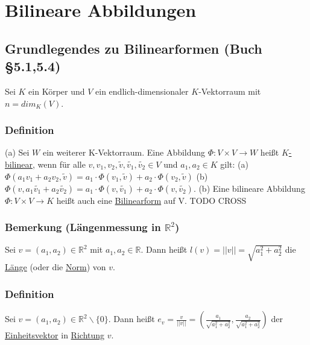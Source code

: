 \documentclass[a4paper]{article}
\newcommand{\ul}{\underline}
\begin{document}
\section{Bilineare Abbildungen}
\setcounter{subsection}{24}
\subsection{Grundlegendes zu Bilinearformen (Buch §5.1,5.4)}
Sei \(K\) ein Körper und \(V\) ein endlich-dimensionaler \(K\)-Vektorraum mit \(n=dim_K(V)\).
\subsubsection{Definition}
(a) Sei \(W\) ein weiterer K-Vektorraum. Eine Abbildung \(\Phi:V\times V\rightarrow W\) heißt \ul{\(K\)-bilinear}, wenn für alle \(v,v_1,v_2,\tilde{v}, \tilde{v_1}, \tilde{v_2} \in V\) und \(a_1, a_2\in K\) gilt:
(a)\(\Phi(a_1v_1+a_2v_2,\tilde{v})=a_1\cdot\Phi(v_1,\tilde{v})+a_2\cdot\Phi(v_2,\tilde{v})\)
(b) \(\Phi(v,a_1\tilde{v_1}+a_2\tilde{v_2})=a_1\cdot\Phi(v,\tilde{v_1})+a_2\cdot\Phi(v,\tilde{v_2})\).
(b) Eine bilineare Abbildung \(\Phi:V\times V\rightarrow K\) heißt auch eine \ul{Bilinearform} auf V. TODO CROSS
\subsubsection{Bemerkung (Längenmessung in \(\mathbb{R}^2\))}
Sei \(v=(a_1,a_2)\in\mathbb{R}^2\) mit \(a_1,a_2\in\mathbb{R}\). Dann heißt \(l(v)=||v|| = \sqrt{a_1^2+a_2^2}\) die \ul{Länge} (oder die \ul{Norm}) von \(v\).
\subsubsection{Definition}
Sei \(v=(a_1,a_2)\in\mathbb{R}^2\backslash\{0\}\). Dann heißt \(e_v=\frac{v}{||v||}=(\frac{a_1}{\sqrt{a_1^2+a_2^2}},\frac{a_2}{\sqrt{a_1^2+a_2^2}})\) der \ul{Einheitsvektor} in \ul{Richtung} \(v\).
\end{document}
